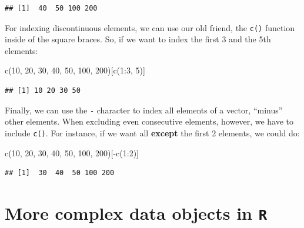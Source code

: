 \documentclass[
]{book}
\newenvironment{Shaded}{\begin{snugshade}}{\end{snugshade}}
\newcommand{\DecValTok}[1]{\textcolor[rgb]{0.00,0.00,0.81}{#1}}
\newcommand{\FunctionTok}[1]{\textcolor[rgb]{0.00,0.00,0.00}{#1}}
\newcommand{\NormalTok}[1]{#1}
\newcommand{\SpecialCharTok}[1]{\textcolor[rgb]{0.00,0.00,0.00}{#1}}
\begin{document}
\begin{verbatim}
## [1]  40  50 100 200
\end{verbatim}

For indexing discontinuous elements, we can use our old friend, the \texttt{c()} function inside of the square braces. So, if we want to index the first 3 and the 5th elements:

\begin{Shaded}
\begin{Highlighting}[]
\FunctionTok{c}\NormalTok{(}\DecValTok{10}\NormalTok{, }\DecValTok{20}\NormalTok{, }\DecValTok{30}\NormalTok{, }\DecValTok{40}\NormalTok{, }\DecValTok{50}\NormalTok{, }\DecValTok{100}\NormalTok{, }\DecValTok{200}\NormalTok{)[}\FunctionTok{c}\NormalTok{(}\DecValTok{1}\SpecialCharTok{:}\DecValTok{3}\NormalTok{, }\DecValTok{5}\NormalTok{)]}
\end{Highlighting}
\end{Shaded}

\begin{verbatim}
## [1] 10 20 30 50
\end{verbatim}

Finally, we can use the \texttt{-} character to index all elements of a vector, ``minus'' other elements. When excluding even consecutive elements, however, we have to include \texttt{c()}. For instance, if we want all \textbf{except} the first 2 elements, we could do:

\begin{Shaded}
\begin{Highlighting}[]
\FunctionTok{c}\NormalTok{(}\DecValTok{10}\NormalTok{, }\DecValTok{20}\NormalTok{, }\DecValTok{30}\NormalTok{, }\DecValTok{40}\NormalTok{, }\DecValTok{50}\NormalTok{, }\DecValTok{100}\NormalTok{, }\DecValTok{200}\NormalTok{)[}\SpecialCharTok{{-}}\FunctionTok{c}\NormalTok{(}\DecValTok{1}\SpecialCharTok{:}\DecValTok{2}\NormalTok{)]}
\end{Highlighting}
\end{Shaded}

\begin{verbatim}
## [1]  30  40  50 100 200
\end{verbatim}

\hypertarget{more-complex-data-objects-in-r}{%
\section{\texorpdfstring{More complex data objects in \texttt{R}}{More complex data objects in R}}\label{more-complex-data-objects-in-r}}
\end{document}
